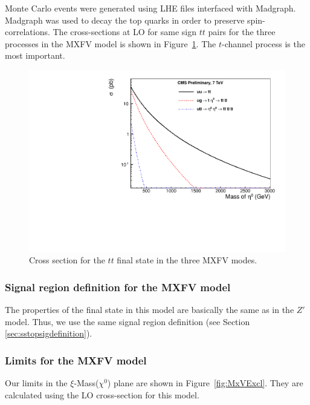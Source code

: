 Monte Carlo events were generated using LHE files\cite{simplifiedModel} interfaced 
with Madgraph.  Madgraph was used to decay the top quarks in order to preserve 
spin-correlations.  The cross-sections at LO for same sign $tt$ pairs for the three
processes in the MXFV model is shown in Figure~\ref{fig:mxvxsec}.  The $t$-channel
process is the most important.

\begin{figure}[htb]
\begin{center}
\includegraphics[width=0.65\linewidth]{figs/mxvxsec.pdf}
\caption{Cross section for the $tt$ final state in the three MXFV modes.
\label{fig:mxvxsec}}
\end{center}
\end{figure}

\subsubsection{Signal region definition for the MXFV model}
\label{sec:mxfvdefinition}
The properties of the final state in this model are basically the same as in the $Z'$ model.
Thus, we use the same signal region definition (see Section \ref{sec:sstopsigdefinition}).


\subsubsection{Limits for the MXFV model}
\label{sec:mxfvlimits}
Our limits in the $\xi$-Mass($\chi^0$) plane are shown in Figure~\ref{fig:MxVExcl}.
They are calculated using the LO cross-section for this model.

